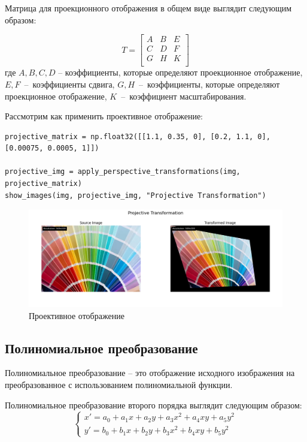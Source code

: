 Матрица для проекционного отображения в общем виде выглядит следующим образом:

\begin{equation}
T = \begin{bmatrix}
    A & B & E \\
    C & D & F \\
    G & H & K \\
\end{bmatrix}
\end{equation}
где $A, B, C, D$ -- коэффициенты, которые определяют проекционное отображение, $E, F$~--~коэффициенты сдвига, $G, H$~--~коэффициенты, которые определяют проекционное отображение, $K$~--~коэффициент масштабирования.

Рассмотрим как применить проективное отображение:
\begin{lstlisting}[style=python_white, caption={Исходный код для проективного отображения}]
projective_matrix = np.float32([[1.1, 0.35, 0], [0.2, 1.1, 0], [0.00075, 0.0005, 1]])

projective_img = apply_perspective_transformations(img, projective_matrix)
show_images(img, projective_img, "Projective Transformation")
\end{lstlisting}

\begin{figure}[ht]
    \includegraphics[width=\textwidth]{../results/Projective Transformation.png}
    \caption{Проективное отображение}
    \label{fig:projective_image}
\end{figure}

\subsection{Полиномиальное преобразование}

Полиномиальное преобразование -- это отображение исходного изображения на преобразованное с использованием полиномиальной функции.

Полиномиальное преобразование второго порядка выглядит следующим образом:
\begin{equation}
\begin{cases}
    x' = a_0 + a_1x + a_2y + a_3x^2 + a_4xy + a_5y^2\\
    y' = b_0 + b_1x + b_2y + b_3x^2 + b_4xy + b_5y^2
\end{cases}
\end{equation}


